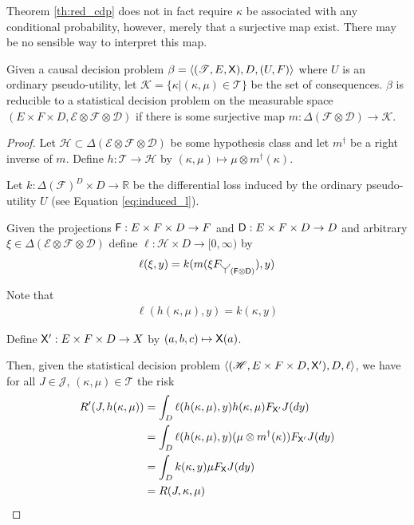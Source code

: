 Theorem \ref{th:red_cdp} does not in fact require $\kappa$ be associated with any conditional probability, however, merely that a surjective map exist. There may be no sensible way to interpret this map.

\begin{theorem}\label{th:red_cdp}
Given a causal decision problem $\beta=\langle (\mathscr{T},E,\mathsf{X}),D,(U,F)\rangle$ where $U$ is an ordinary pseudo-utility, let $\mathscr{K}=\{\kappa|(\kappa,\mu)\in \mathscr{T}\}$ be the set of consequences. $\beta$ is reducible to a statistical decision problem on the measurable space $(E\times F\times D,\mathcal{E}\otimes \mathcal{F}\otimes \mathcal{D})$ if there is some surjective map $m:\Delta(\mathcal{F}\otimes\mathcal{D})\to \mathscr{K}$.
\end{theorem}

\begin{proof}
Let $\mathscr{H}\subset \Delta(\mathcal{E}\otimes \mathcal{F}\otimes \mathcal{D})$ be some hypothesis class and let $m^\dagger$ be a right inverse of $m$. Define $h:\mathscr{T}\to \mathscr{H}$ by $(\kappa,\mu)\mapsto \mu \otimes m^{\dagger}(\kappa)$.

Let $k:\Delta(\mathcal{F})^D\times D\to \mathbb{R}$ be the differential loss induced by the ordinary pseudo-utility $U$ (see Equation \ref{eq:induced_l}).

Given the projections $\mathsf{F}:E\times F\times D\to F$ and $\mathsf{D}:E\times F \times D\to D$ and arbitrary $\xi\in\Delta(\mathcal{E}\otimes \mathcal{F} \otimes\mathcal{D})$ define $\ell:\mathscr{H}\times D\to [0,\infty)$ by
\begin{align}
    \ell(\xi,y) = k(m(\xi F_{\splitter{0.15}(\RV{F}\otimes\RV{D})}),y)
\end{align}

Note that
\begin{align}
    \ell(h(\kappa,\mu),y) = k(\kappa,y)
\end{align}

Define $\mathsf{X}':E\times F \times D\to X$ by $(a,b,c)\mapsto \mathsf{X}(a)$.

Then, given the statistical decision problem $\langle(\mathscr{H},E\times F\times D,\mathsf{X}'),D,\ell\rangle$, we have for all $J\in \mathscr{J}$, $(\kappa,\mu)\in\mathscr{T}$ the risk
\begin{align}
    R'(J,h(\kappa,\mu)) &= \int_D \ell (h(\kappa,\mu),y)  h(\kappa,\mu) F_{\mathsf{X}'} J(dy) \\
                        &= \int_D \ell (h(\kappa,\mu),y)  (\mu\otimes m^\dagger(\kappa)) F_{\mathsf{X}'} J(dy) \\
                        &= \int_D k(\kappa,y) \mu F_{\mathsf{X}} J(dy)\\
                        &= R(J,\kappa,\mu)
\end{align}
\end{proof}

